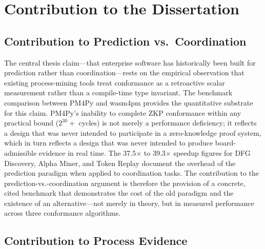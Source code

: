 
\section{Contribution to the Dissertation}
\label{sec:experiments-core-contribution}

\subsection{Contribution to Prediction vs.~Coordination}
\label{sec:experiments-core-contribution-prediction}

The central thesis claim---that enterprise software has historically been built for
prediction rather than coordination---rests on the empirical observation that existing
process-mining tools treat conformance as a retroactive scalar measurement rather than
a compile-time type invariant. The benchmark comparison between PM4Py and wasm4pm
provides the quantitative substrate for this claim. PM4Py's inability to complete
ZKP conformance within any practical bound ($2^{30}+$ cycles) is not merely a
performance deficiency; it reflects a design that was never intended to participate
in a zero-knowledge proof system, which in turn reflects a design that was never
intended to produce board-admissible evidence in real time. The 37.5$\times$ to
39.3$\times$ speedup figures for DFG Discovery, Alpha Miner, and Token Replay
document the overhead of the prediction paradigm when applied to coordination
tasks. The contribution to the prediction-vs.-coordination argument is therefore
the provision of a concrete, cited benchmark that demonstrates the cost of the
old paradigm and the existence of an alternative---not merely in theory, but in
measured performance across three conformance algorithms.

\subsection{Contribution to Process Evidence}
\label{sec:experiments-core-contribution-evidence}

